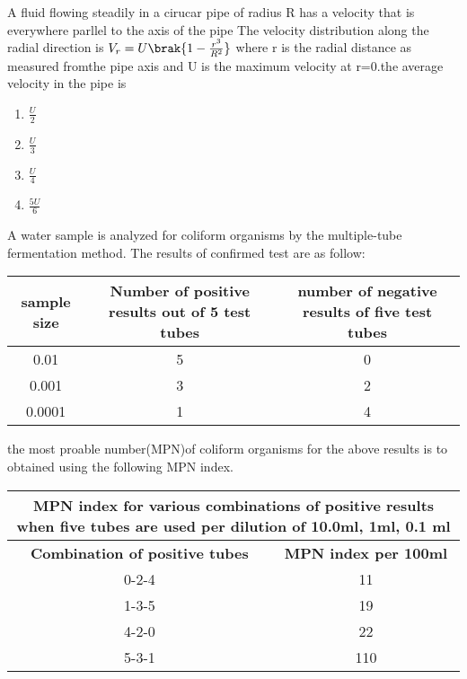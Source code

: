 \bigskip
\item A fluid flowing steadily in a cirucar pipe of radius R has a velocity that is everywhere parllel to the axis of the pipe The velocity distribution along the radial direction is $V_r=U\brak{1-\frac{r^3}{R^2}}$ where r is the radial distance as measured fromthe pipe axis and U is the maximum velocity at r=0.the average velocity in the pipe is 
\begin{enumerate}
    \item $\frac{U}{2}$
    \item $\frac{U}{3}$
    \item $\frac{U}{4}$
    \item $\frac{5U}{6}$
\end{enumerate}
\bigskip
\item A water sample is analyzed for coliform organisms by the multiple-tube fermentation method. The results of confirmed test are as follow: 
\begin{tabular}{|c|c|c|}
\hline
\textbf{sample size} & \textbf{Number of positive results out of 5 test tubes}&\textbf{number of negative results of five test tubes}\\
\hline
0.01 & 5 & 0\\
\hline
0.001 & 3 & 2\\
\hline 
0.0001 & 1 & 4\\
\hline 
\end{tabular}
the most proable number(MPN)of coliform organisms for the above results is to obtained using the following MPN index.
\begin{tabular}{|c|c|}
\hline
\multicolumn{2}{|c|}{\textbf{MPN index for various combinations of positive results when five tubes are used per dilution of 10.0ml, 1ml, 0.1 ml}} \\
\hline
\textbf{Combination of positive tubes} & \textbf{MPN index per 100ml} \\
\hline
0-2-4 & 11 \\
\hline
1-3-5 & 19 \\
\hline
4-2-0 & 22 \\
\hline 
5-3-1 & 110 \\
\hline
\end{tabular}

